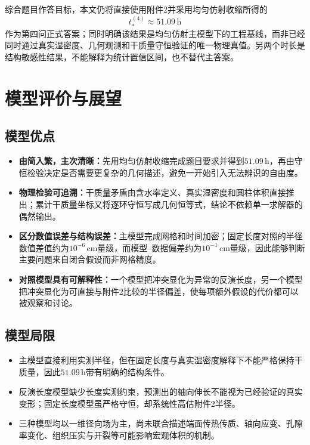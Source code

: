 \documentclass[withoutpreface,bwprint]{cumcmthesis}
\begin{document}
综合题目作答目标，本文仍将直接使用附件2并采用均匀仿射收缩所得的
\[
\boxed{t_*^{(4)}\approx51.09\,\mathrm h}
\]
作为第四问正式答案；同时明确该结果是均匀仿射主模型下的工程基线，而非已经同时通过真实湿密度、几何观测和干质量守恒验证的唯一物理真值。另两个时长是结构敏感性结果，不能解释为统计置信区间，也不替代主答案。


\section{模型评价与展望}

\subsection{模型优点}
\begin{itemize}[leftmargin=2em,itemsep=2pt,topsep=2pt]
  \item \textbf{由简入繁，主次清晰：}先用均匀仿射收缩完成题目要求并得到$51.09\,\mathrm h$，再由守恒检验决定是否需要更复杂的几何描述，避免一开始引入无法辨识的自由度。
  \item \textbf{物理检验可追溯：}干质量矛盾由含水率定义、真实湿密度和圆柱体积直接推出；累计干质量坐标又将逐环守恒写成几何恒等式，结论不依赖单一求解器的偶然输出。
  \item \textbf{区分数值误差与结构误差：}主模型完成网格和时间加密；固定长度对照的半径数值差值约为$10^{-6}\,\mathrm{cm}$量级，而模型--数据偏差约为$10^{-1}\,\mathrm{cm}$量级，因此能够判断主要问题来自闭合假设而非网格精度。
  \item \textbf{对照模型具有可解释性：}一个模型把冲突显化为异常的反演长度，另一个模型把冲突显化为可直接与附件2比较的半径偏差，使每项额外假设的代价都可以被观察和讨论。
\end{itemize}

\subsection{模型局限}
\begin{itemize}[leftmargin=2em,itemsep=2pt,topsep=2pt]
  \item 主模型直接利用实测半径，但在固定长度与真实湿密度解释下不能严格保持干质量，因此$51.09\,\mathrm h$带有明确的结构条件。
  \item 反演长度模型缺少长度实测约束，预测出的轴向伸长不能视为已经验证的真实变形；固定长度模型虽严格守恒，却系统性高估附件2半径。
  \item 三种模型均以一维径向场为主，尚未联合描述端面传热传质、轴向应变、孔隙率变化、组织压实与开裂等可能影响宏观体积的机制。
\end{itemize}
\end{document}
